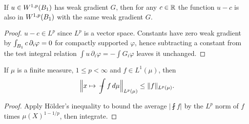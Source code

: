 \begin{lemma}
\label{lem:memW1pWitness_sub_const_unitBall}
\leanok
{}
If $u \in W^{1,p}(B_{1})$ has weak gradient $G$, then for any $c \in \mathbb{R}$ the function
$u - c$ is also in $W^{1,p}(B_{1})$ with the same weak gradient $G$.
\end{lemma}
\begin{proof}
\leanok
{}

$u - c \in L^{p}$ since $L^{p}$ is a vector space. Constants have zero weak gradient by
$\int_{B_{1}} c\, \partial_i \varphi = 0$ for compactly supported $\varphi$, hence
subtracting a constant from the test integral relation
$\int u\,\partial_i \varphi = -\int G_i \varphi$ leaves it unchanged.
\end{proof}

\begin{lemma}
\label{lem:eLpNorm_const_average_le}
\leanok
If $\mu$ is a finite measure, $1 \le p < \infty$ and $f \in L^{1}(\mu)$, then
\begin{equation*}
\Bigl\lVert x \mapsto \fint f\, d\mu \Bigr\rVert_{\Lp{p}(\mu)}
\le \lVert f \rVert_{\Lp{p}(\mu)}.
\end{equation*}
\end{lemma}
\begin{proof}
\leanok

Apply H\"older's inequality to bound the average $\lvert\fint f\rvert$ by the
$L^{p}$ norm of $f$ times $\mu(X)^{1-1/p}$, then integrate.
\end{proof}

